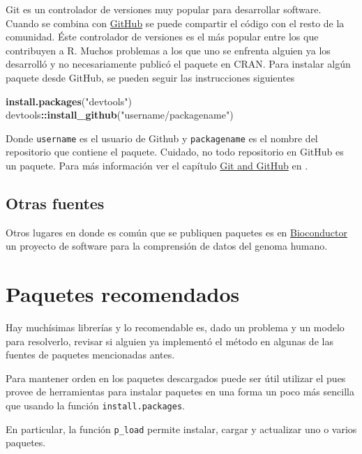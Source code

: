 \documentclass[]{article}
\newenvironment{Shaded}{\begin{snugshade}}{\end{snugshade}}
\newcommand{\KeywordTok}[1]{\textcolor[rgb]{0.13,0.29,0.53}{\textbf{#1}}}
\newcommand{\StringTok}[1]{\textcolor[rgb]{0.31,0.60,0.02}{#1}}
\newcommand{\OperatorTok}[1]{\textcolor[rgb]{0.81,0.36,0.00}{\textbf{#1}}}
\newcommand{\NormalTok}[1]{#1}
\begin{document}
Git es un controlador de versiones muy popular para desarrollar
software. Cuando se combina con \href{https://github.com/}{GitHub} se
puede compartir el código con el resto de la comunidad. Éste controlador
de versiones es el más popular entre los que contribuyen a R. Muchos
problemas a los que uno se enfrenta alguien ya los desarrolló y no
necesariamente publicó el paquete en CRAN. Para instalar algún paquete
desde GitHub, se pueden seguir las instrucciones siguientes

\begin{Shaded}
\begin{Highlighting}[]
\KeywordTok{install.packages}\NormalTok{(}\StringTok{"devtools"}\NormalTok{)}
\NormalTok{devtools}\OperatorTok{::}\KeywordTok{install_github}\NormalTok{(}\StringTok{"username/packagename"}\NormalTok{)}
\end{Highlighting}
\end{Shaded}

Donde \texttt{username} es el usuario de Github y \texttt{packagename}
es el nombre del repositorio que contiene el paquete. Cuidado, no todo
repositorio en GitHub es un paquete. Para más información ver el
capítulo \href{http://r-pkgs.had.co.nz/git.html}{Git and GitHub} en
\textcite{wickham2015r}.

\subsection{Otras fuentes}\label{otras-fuentes}

Otros lugares en donde es común que se publiquen paquetes es en
\href{https://www.bioconductor.org/}{Bioconductor} un proyecto de
software para la comprensión de datos del genoma humano.

\section{Paquetes recomendados}\label{paquetes-recomendados}

Hay muchísimas librerías y lo recomendable es, dado un problema y un
modelo para resolverlo, revisar si alguien ya implementó el método en
algunas de las fuentes de paquetes mencionadas antes.

Para mantener orden en los paquetes descargados puede ser útil utilizar
el \textcite{pacman} pues provee de herramientas para instalar paquetes
en una forma un poco más sencilla que usando la función
\texttt{install.packages}.

En particular, la función \texttt{p\_load} permite instalar, cargar y
actualizar uno o varios paquetes.
\end{document}
